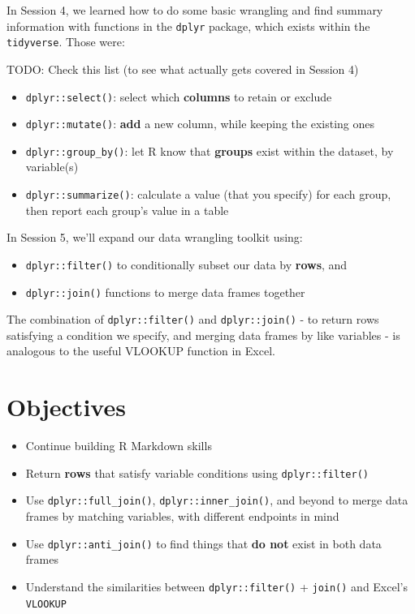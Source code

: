 \documentclass[]{book}
\providecommand{\tightlist}{%
  \setlength{\itemsep}{0pt}\setlength{\parskip}{0pt}}
\begin{document}
In Session 4, we learned how to do some basic wrangling and find summary information with functions in the \texttt{dplyr} package, which exists within the \texttt{tidyverse}. Those were:

TODO: Check this list (to see what actually gets covered in Session 4)

\begin{itemize}
\tightlist
\item
  \texttt{dplyr::select()}: select which \textbf{columns} to retain or exclude
\item
  \texttt{dplyr::mutate()}: \textbf{add} a new column, while keeping the existing ones
\item
  \texttt{dplyr::group\_by()}: let R know that \textbf{groups} exist within the dataset, by variable(s)
\item
  \texttt{dplyr::summarize()}: calculate a value (that you specify) for each group, then report each group's value in a table
\end{itemize}

In Session 5, we'll expand our data wrangling toolkit using:

\begin{itemize}
\tightlist
\item
  \texttt{dplyr::filter()} to conditionally subset our data by \textbf{rows}, and
\item
  \texttt{dplyr::join()} functions to merge data frames together
\end{itemize}

The combination of \texttt{dplyr::filter()} and \texttt{dplyr::join()} - to return rows satisfying a condition we specify, and merging data frames by like variables - is analogous to the useful VLOOKUP function in Excel.

\hypertarget{objectives-1}{%
\section{Objectives}\label{objectives-1}}

\begin{itemize}
\tightlist
\item
  Continue building R Markdown skills
\item
  Return \textbf{rows} that satisfy variable conditions using \texttt{dplyr::filter()}
\item
  Use \texttt{dplyr::full\_join()}, \texttt{dplyr::inner\_join()}, and beyond to merge data frames by matching variables, with different endpoints in mind
\item
  Use \texttt{dplyr::anti\_join()} to find things that \textbf{do not} exist in both data frames
\item
  Understand the similarities between \texttt{dplyr::filter()} + \texttt{join()} and Excel's \texttt{VLOOKUP}
\end{itemize}
\end{document}
